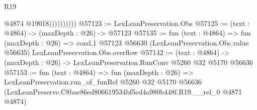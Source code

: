 \begin{lexlean}{R19}
\begin{coremodule}
                        @4874
                        @19018))))))))))
@57123 := LexLeanPreservation.Obs
@57125 := (text : @4864) -> (maxDepth : @26) -> @57123
@57135 := fun (text : @4864) =>
  fun (maxDepth : @26) =>
  cond.{1} @57123 @56630 (LexLeanPreservation.Obs.value @56635) LexLeanPreservation.Obs.overflow
@57142 := (text : @4864) -> (maxDepth : @26) -> LexLeanPreservation.RunConv @5260 @32 @5170 @56636
@57153 := fun (text : @4864) =>
  fun (maxDepth : @26) =>
  LexLeanPreservation.run_of_funRel
    @5260
    @32
    @5170
    @56636
    (LexLeanPreserve.C8bae86ed806619534bf5ed4a980b448f.R19.__rel_0 @4871 @4874)
\end{coremodule}
\end{lexlean}
